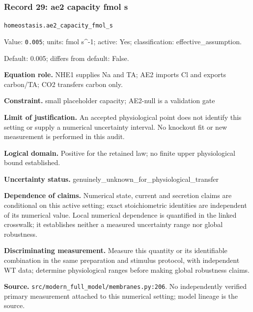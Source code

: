 \subsubsection*{Record 29: ae2 capacity fmol s}
{\small \nolinkurl{homeostasis.ae2_capacity_fmol_s}\par

Value: \texttt{0.005}; units: fmol s\textasciicircum{}-1; active: Yes; classification: effective\_assumption.\par

Default: 0.005; differs from default: False.\par

\textbf{Equation role.} NHE1 supplies Na and TA; AE2 imports Cl and exports carbon/TA; CO2 transfers carbon only.\par

\textbf{Constraint.} small placeholder capacity; AE2-null is a validation gate\par

\textbf{Limit of justification.} An accepted physiological point does not identify this setting or supply a numerical uncertainty interval. No knockout fit or new measurement is performed in this audit.\par

\textbf{Logical domain.} Positive for the retained law; no finite upper physiological bound established.\par

\textbf{Uncertainty status.} genuinely\_unknown\_for\_physiological\_transfer\par

\textbf{Dependence of claims.} Numerical state, current and secretion claims are conditional on this active setting; exact stoichiometric identities are independent of its numerical value. Local numerical dependence is quantified in the linked crosswalk; it establishes neither a measured uncertainty range nor global robustness.\par

\textbf{Discriminating measurement.} Measure this quantity or its identifiable combination in the same preparation and stimulus protocol, with independent WT data; determine physiological ranges before making global robustness claims.\par

\textbf{Source.} \nolinkurl{src/modern_full_model/membranes.py:206}. No independently verified primary measurement attached to this numerical setting; model lineage is the source.\par}

